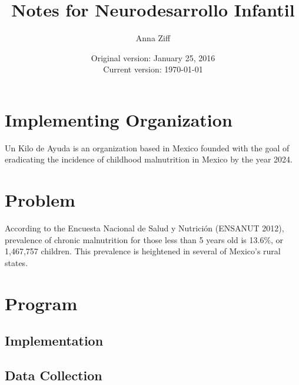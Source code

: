 \documentclass{article}
\begin{document}
\title{Notes for Neurodesarrollo Infantil}
\author{Anna Ziff}
\date{Original version: January 25, 2016 \\ Current version: \today}
\maketitle

\listoftodos
\tableofcontents

\section{Implementing Organization}
Un Kilo de Ayuda is an organization based in Mexico founded with the goal of eradicating the incidence of childhood malnutrition in Mexico by the year 2024. 

\section{Problem}
According to the Encuesta Nacional de Salud y Nutrici\'{o}n (ENSANUT 2012), prevalence of chronic malnutrition for those less than 5 years old is 13.6\%, or 1,467,757 children. This prevalence is heightened in several of Mexico's rural states.

\section{Program}
\subsection{Implementation}
\subsection{Data Collection}

\end{document}
